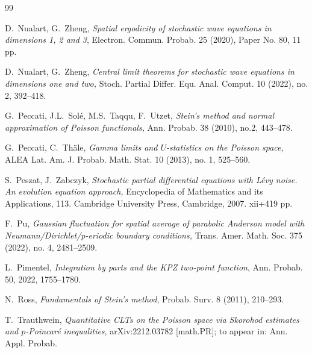 \documentclass[letterpaper, 11pt,  reqno]{amsart}
\numberwithin{equation}{section}
\numberwithin{theorem}{section}
\begin{document}
\begin{thebibliography}{99}

 D.~Nualart, G.~Zheng,
{\it Spatial ergodicity of stochastic wave equations in dimensions 1, 2 and 3},
Electron. Commun. Probab.  25 (2020), Paper No. 80, 11 pp.








D.~Nualart, G.~Zheng,
{\it Central limit theorems for stochastic wave equations in
dimensions one and two,}
Stoch. Partial Differ. Equ. Anal. Comput. 10 (2022), no. 2, 392--418.

 




G.~Peccati,  J.L.~Sol\'e, M.S.~Taqqu, F.~Utzet,
{\it Stein's method and normal approximation of Poisson functionals,}
Ann. Probab. 38 (2010), no.2, 443--478.



G.~Peccati,  C.~Th\"ale,
{\it Gamma limits and $U$-statistics on the Poisson space,}
ALEA Lat. Am. J. Probab. Math. Stat. 10 (2013), no. 1, 525--560.


S.~Peszat, J.~Zabczyk,
{\it Stochastic partial differential equations with L\'evy noise.
An evolution equation approach,}
Encyclopedia of Mathematics and its Applications, 113. 
Cambridge University Press,
Cambridge, 2007. xii+419 pp.




F.~Pu,
{\it  Gaussian fluctuation for spatial average of parabolic Anderson model with
Neumann/Dirichlet/p-eriodic 
boundary conditions,}
Trans. Amer. Math. Soc. 375 (2022), no. 4, 2481--2509.




L.~Pimentel, 
{\it Integration by parts and the KPZ two-point function},
Ann. Probab.  50, 2022,  1755--1780.



N.~Ross,  
{\it Fundamentals of Stein's method},
Probab. Surv. 8 (2011), 210--293.

 


 

T.~Trauthwein,
{\it Quantitative CLTs on the Poisson space via Skorohod estimates 
and $p$-Poincar\'e inequalities},
arXiv:2212.03782 [math.PR]; to appear in: Ann. Appl. Probab.


\end{thebibliography}
\end{document}
